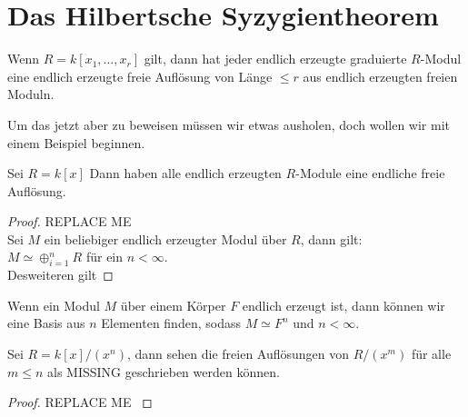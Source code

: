 \documentclass{article}
\begin{document}
\section{Das Hilbertsche Syzygientheorem}
	\begin{thm}
		Wenn 
		\( R = k \left[ x_1,\dots,x_r \right] \)
		gilt,
		dann hat jeder endlich erzeugte graduierte 
		\(R \)-Modul 
		eine endlich erzeugte freie Aufl\"osung von L\"ange 
		\( \le r \) 
		aus endlich erzeugten freien Moduln.
	\end{thm}
	Um das jetzt aber zu beweisen m\"ussen wir etwas ausholen, 
	doch wollen wir mit einem Beispiel beginnen.
	\begin{bsp}[\nocite{Eis1}{Exercise 1.22}]
		Sei 
		\( R = k\left[ x \right] \)
		Dann haben alle endlich erzeugten 
		\(R\)-Module 
		eine endliche freie Aufl\"osung.
		\begin{proof}
			{\color{red} REPLACE ME \\ }
			Sei 
			\( M \) 
			ein beliebiger endlich erzeugter Modul \"uber 
			\( R \),
			dann gilt: \\
			\( M \simeq \oplus_{i=1}^{n} R \) 
			f\"ur ein 
			\( n < \infty . \) \\
			Desweiteren gilt 
		\end{proof}
	\end{bsp}	
	\begin{thm}
		Wenn ein Modul 
		\( M \)
		\"uber einem K\"orper 
		\( F \) 
		endlich erzeugt ist, 
		dann k\"onnen wir eine Basis aus
		\( n \) 
		Elementen finden,
		sodass 
		\(
			M \simeq F^{n} 
		\)
		und 
		\( n < \infty \).
	\end{thm}
	\begin{bsp}
		Sei 
		\( R= k\left[ x \right] \big/ \left( x^{n} \right) \),
		dann sehen die freien Aufl\"osungen von 
		\( R\big/ \left( x^{m} \right) \) 
		f\"ur alle 
		\( m \le n \)
		als 
		{\color{red}MISSING}
		geschrieben werden k\"onnen.
		\begin{proof}
			{\color{red} REPLACE ME }

		\end{proof}
	\end{bsp}
\end{document}
